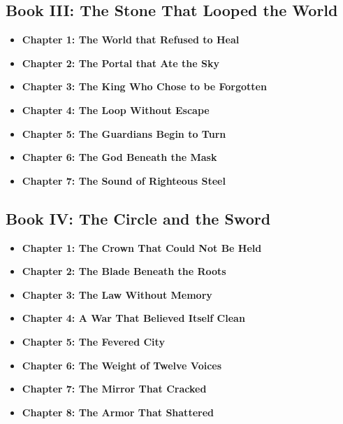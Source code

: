 \documentclass[9pt]{article}
\begin{document}
\subsection*{Book III: The Stone That Looped the World}
\begin{itemize}
  \item \textbf{Chapter 1: The World that Refused to Heal}
  \item \textbf{Chapter 2: The Portal that Ate the Sky}
  \item \textbf{Chapter 3: The King Who Chose to be Forgotten}
  \item \textbf{Chapter 4: The Loop Without Escape}
  \item \textbf{Chapter 5: The Guardians Begin to Turn}
  \item \textbf{Chapter 6: The God Beneath the Mask}
  \item \textbf{Chapter 7: The Sound of Righteous Steel}
\end{itemize}

\subsection*{Book IV: The Circle and the Sword}
\begin{itemize}
  \item \textbf{Chapter 1: The Crown That Could Not Be Held}
  \item \textbf{Chapter 2: The Blade Beneath the Roots}
  \item \textbf{Chapter 3: The Law Without Memory}
  \item \textbf{Chapter 4: A War That Believed Itself Clean}
  \item \textbf{Chapter 5: The Fevered City}
  \item \textbf{Chapter 6: The Weight of Twelve Voices}
  \item \textbf{Chapter 7: The Mirror That Cracked}
  \item \textbf{Chapter 8: The Armor That Shattered}
\end{itemize}
\end{document}
